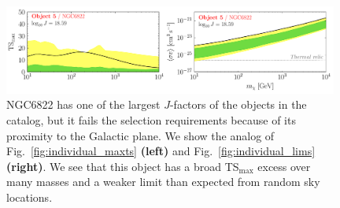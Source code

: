 
\begin{figure}[htbp]
  \centering
  \includegraphics[width=0.98\textwidth]{ch-clusters/plots/object5_maxts_lim.pdf}
  \caption{NGC6822 has one of the largest $J$-factors of the objects in the catalog, but it fails the selection requirements because of its proximity to the Galactic plane.  We show the analog of Fig.~\ref{fig:individual_maxts} \textbf{(left)} and Fig.~\ref{fig:individual_lims} \textbf{(right)}. We see that this object  has a broad TS$_\text{max}$ excess over many masses and a weaker limit than expected from random sky locations.}
  \label{fig:maxTSoneobject}
\end{figure}


